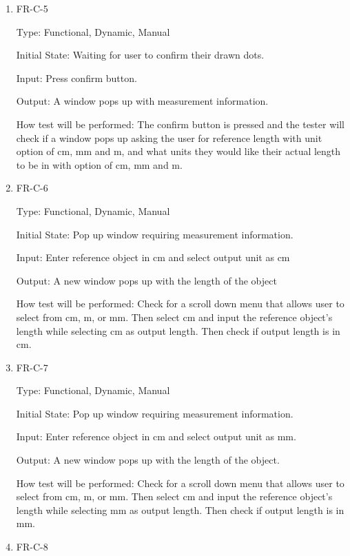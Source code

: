 \documentclass[12pt, titlepage]{article}
\begin{document}
\begin{enumerate}
					\item{FR-C-5\\}
					
					Type: Functional, Dynamic, Manual
					
					Initial State: Waiting for user to confirm their drawn dots.
					
					Input: Press confirm button.
					
					Output: A window pops up with measurement information.
					
					How test will be performed: The confirm button is pressed and the tester will check if a window pops up asking the user for reference length with unit option of cm, mm and m, and what units they would like their actual length to be in with option of cm, mm and m.
				
					\item{FR-C-6\\}
					
					Type: Functional, Dynamic, Manual
					
					Initial State: Pop up window requiring measurement information.
					
					Input: Enter reference object in cm and select output unit as cm
					
					Output: A new window pops up with the length of the object
					
					How test will be performed: Check for a scroll down menu that allows user to select from cm, m, or mm. Then select cm and input the reference object's length while selecting cm as output length. Then check if output length is in cm.
					\item{FR-C-7\\}
					
					Type: Functional, Dynamic, Manual
					
					Initial State: Pop up window requiring measurement information.
					
					Input: Enter reference object in cm and select output unit as mm.
					
					Output: A new window pops up with the length of the object.
					
					How test will be performed: Check for a scroll down menu that allows user to select from cm, m, or mm. Then select cm and input the reference object's length while selecting mm as output length. Then check if output length is in mm.
				
				    \item{FR-C-8\\}
					

\end{enumerate}
\end{document}
